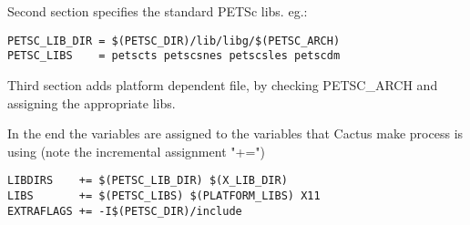 \documentclass{article}
\begin{document}
Second section specifies the standard PETSc libs. eg.:
\begin{verbatim}
PETSC_LIB_DIR = $(PETSC_DIR)/lib/libg/$(PETSC_ARCH)
PETSC_LIBS    = petscts petscsnes petscsles petscdm
\end{verbatim}

Third section adds platform dependent file, by checking  
PETSC\_ARCH and assigning the appropriate libs.

In the end the variables are assigned to the variables that Cactus
make process is using (note the incremental assignment "+=")

\begin{verbatim}
LIBDIRS    += $(PETSC_LIB_DIR) $(X_LIB_DIR)
LIBS       += $(PETSC_LIBS) $(PLATFORM_LIBS) X11
EXTRAFLAGS += -I$(PETSC_DIR)/include
\end{verbatim} 


\end{document}

